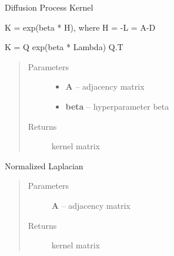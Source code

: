 \documentclass[letterpaper,10pt,english]{sphinxmanual}
\begin{document}
\begin{fulllineitems}
\label{pyGPs.GraphExtensions:pyGPs.GraphExtensions.nodeKernels.diffKernel}
Diffusion Process Kernel

K = exp(beta * H), where H = -L = A-D

K = Q exp(beta * Lambda) Q.T
\begin{quote}\begin{description}
\item[{Parameters}] \leavevmode\begin{itemize}
\item {} 
\textbf{A} -- adjacency matrix

\item {} 
\textbf{beta} -- hyperparameter beta

\end{itemize}

\item[{Returns}] \leavevmode
kernel matrix

\end{description}\end{quote}

\end{fulllineitems}


\begin{fulllineitems}
\label{pyGPs.GraphExtensions:pyGPs.GraphExtensions.nodeKernels.normLap}
Normalized Laplacian
\begin{quote}\begin{description}
\item[{Parameters}] \leavevmode
\textbf{A} -- adjacency matrix

\item[{Returns}] \leavevmode
kernel matrix

\end{description}\end{quote}

\end{fulllineitems}

\end{document}
